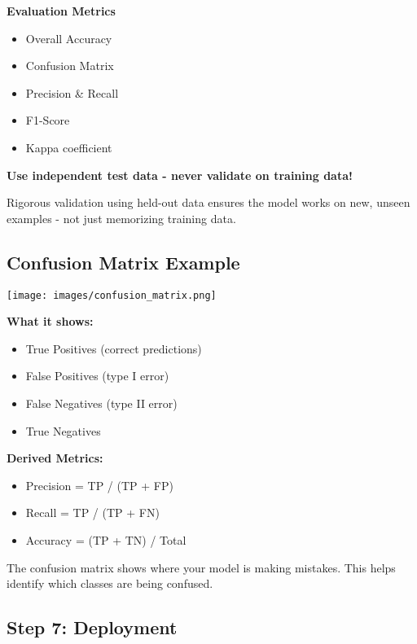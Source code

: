 \documentclass[
  letterpaper,
  DIV=11,
  numbers=noendperiod]{scrartcl}
\providecommand{\tightlist}{%
  \setlength{\itemsep}{0pt}\setlength{\parskip}{0pt}}
\begin{document}
\textbf{Evaluation Metrics}

\begin{itemize}
\tightlist
\item
  Overall Accuracy
\item
  Confusion Matrix
\item
  Precision \& Recall
\item
  F1-Score
\item
  Kappa coefficient
\end{itemize}

\textbf{Use independent test data - never validate on training data!}

Rigorous validation using held-out data ensures the model works on new,
unseen examples - not just memorizing training data.

\subsection{Confusion Matrix Example}\label{confusion-matrix-example}

\begin{center}
\texttt{[image: images/confusion\_matrix.png]}
\end{center}

\textbf{What it shows:}

\begin{itemize}
\tightlist
\item
  True Positives (correct predictions)
\item
  False Positives (type I error)
\item
  False Negatives (type II error)
\item
  True Negatives
\end{itemize}

\textbf{Derived Metrics:}

\begin{itemize}
\tightlist
\item
  Precision = TP / (TP + FP)
\item
  Recall = TP / (TP + FN)
\item
  Accuracy = (TP + TN) / Total
\end{itemize}

The confusion matrix shows where your model is making mistakes. This
helps identify which classes are being confused.

\subsection{Step 7: Deployment}\label{step-7-deployment}
\end{document}

